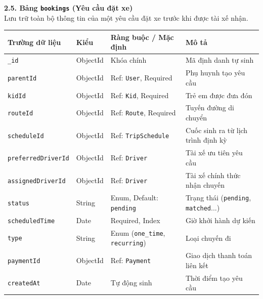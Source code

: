 \documentclass[../DoAn.tex]{subfiles}
\begin{document}
\textbf{2.5. Bảng \texttt{bookings} (Yêu cầu đặt xe)} \\
Lưu trữ toàn bộ thông tin của một yêu cầu đặt xe trước khi được tài xế nhận.
\begin{table}[H]
    \centering
    \begin{tabular}{|l|l|p{4cm}|p{5cm}|}
        \hline
        \textbf{Trường dữ liệu}    & \textbf{Kiểu} & \textbf{Ràng buộc / Mặc định}                 & \textbf{Mô tả}                                     \\ \hline
        \texttt{\_id}              & ObjectId      & Khóa chính                                    & Mã định danh tự sinh                               \\ \hline
        \texttt{parentId}          & ObjectId      & Ref: \texttt{User}, Required                  & Phụ huynh tạo yêu cầu                              \\ \hline
        \texttt{kidId}             & ObjectId      & Ref: \texttt{Kid}, Required                   & Trẻ em được đưa đón                                \\ \hline
        \texttt{routeId}           & ObjectId      & Ref: \texttt{Route}, Required                 & Tuyến đường di chuyển                              \\ \hline
        \texttt{scheduleId}        & ObjectId      & Ref: \texttt{TripSchedule}                    & Cuốc sinh ra từ lịch trình định kỳ                 \\ \hline
        \texttt{preferredDriverId} & ObjectId      & Ref: \texttt{Driver}                          & Tài xế ưu tiên yêu cầu                             \\ \hline
        \texttt{assignedDriverId}  & ObjectId      & Ref: \texttt{Driver}                          & Tài xế chính thức nhận chuyến                      \\ \hline
        \texttt{status}            & String        & Enum, Default: \texttt{pending}               & Trạng thái (\texttt{pending}, \texttt{matched}...) \\ \hline
        \texttt{scheduledTime}     & Date          & Required, Index                               & Giờ khởi hành dự kiến                              \\ \hline
        \texttt{type}              & String        & Enum (\texttt{one\_time}, \texttt{recurring}) & Loại chuyến đi                                     \\ \hline
        \texttt{paymentId}         & ObjectId      & Ref: \texttt{Payment}                         & Giao dịch thanh toán liên kết                      \\ \hline
        \texttt{createdAt}         & Date          & Tự động sinh                                  & Thời điểm tạo yêu cầu                              \\ \hline
    \end{tabular}
\end{table}
\end{document}
